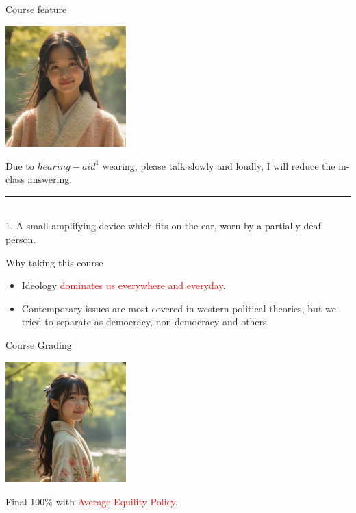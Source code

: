 \documentclass{beamer}
\begin{document}
\begin{frame}{Course feature}
\begin{center}
\includegraphics[width=0.35\textwidth]{feature.png}
\end{center}
\begin{center}
Due to $hearing-aid^{1}$ wearing, please talk slowly and loudly, I will reduce the in-class answering.
\end{center}
\vspace{1em}
\rule{0.35\textwidth}{0.5pt} \\
\scriptsize 1. A small amplifying device which fits on the ear, worn by a partially deaf person.
\end{frame}
\begin{frame}{Why taking this course}
\begin{itemize}
\item Ideology \textcolor{red}{dominates us everywhere and everyday}.
\item Contemporary issues are most covered in western political theories, but we tried to separate as democracy, non-democracy and others.
\end{itemize}
\end{frame}
\begin{frame}{Course Grading}
\begin{center}
\includegraphics[width=0.35\textwidth]{examination.png}
\end{center}
\begin{center}
Final 100\% with \textcolor{red}{Average Equility Policy}.
\end{center}
\end{frame}
\end{document}
